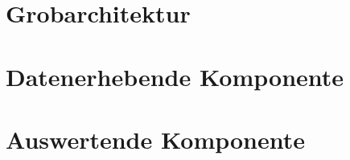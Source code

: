 	
\section{Grobarchitektur}
\textit{\lipsum[1]}

\section{Datenerhebende Komponente}
\textit{\lipsum[1]}

\section{Auswertende Komponente}
\textit{\lipsum[1]}